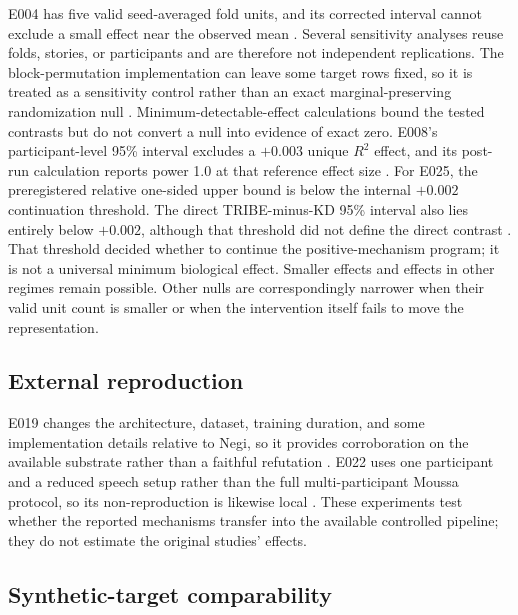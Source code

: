 E004 has five valid seed-averaged fold units, and its corrected interval cannot exclude a small effect near the observed mean .
Several sensitivity analyses reuse folds, stories, or participants and are therefore not independent replications.
The block-permutation implementation can leave some target rows fixed, so it is treated as a sensitivity control rather than an exact marginal-preserving randomization null .
Minimum-detectable-effect calculations bound the tested contrasts but do not convert a null into evidence of exact zero.
E008's participant-level 95\% interval excludes a $+0.003$ unique $R^2$ effect, and its post-run calculation reports power 1.0 at that reference effect size .
For E025, the preregistered relative one-sided upper bound is below the internal $+0.002$ continuation threshold.
The direct TRIBE-minus-KD 95\% interval also lies entirely below $+0.002$, although that threshold did not define the direct contrast .
That threshold decided whether to continue the positive-mechanism program; it is not a universal minimum biological effect.
Smaller effects and effects in other regimes remain possible.
Other nulls are correspondingly narrower when their valid unit count is smaller or when the intervention itself fails to move the representation.

\subsection{External reproduction}

E019 changes the architecture, dataset, training duration, and some implementation details relative to Negi, so it provides corroboration on the available substrate rather than a faithful refutation .
E022 uses one participant and a reduced speech setup rather than the full multi-participant Moussa protocol, so its non-reproduction is likewise local .
These experiments test whether the reported mechanisms transfer into the available controlled pipeline; they do not estimate the original studies' effects.

\subsection{Synthetic-target comparability}

